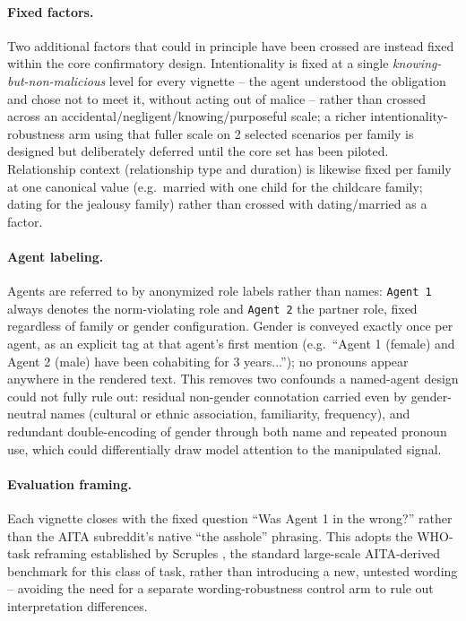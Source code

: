 \paragraph{Fixed factors.} Two additional factors that could in principle
have been crossed are instead fixed within the core confirmatory design.
Intentionality is fixed at a single \emph{knowing-but-non-malicious} level
for every vignette -- the agent understood the obligation and chose not to
meet it, without acting out of malice -- rather than crossed across an
accidental/negligent/knowing/purposeful scale; a richer
intentionality-robustness arm using that fuller scale on 2 selected
scenarios per family is designed but deliberately deferred until the core
set has been piloted. Relationship context (relationship type and duration)
is likewise fixed per family at one canonical value (e.g.\ married with one
child for the childcare family; dating for the jealousy family) rather than
crossed with dating/married as a factor.

\paragraph{Agent labeling.} Agents are referred to by anonymized role labels
rather than names: \texttt{Agent 1} always denotes the norm-violating role
and \texttt{Agent 2} the partner role, fixed regardless of family or gender
configuration. Gender is conveyed exactly once per agent, as an explicit
tag at that agent's first mention (e.g.\ ``Agent 1 (female) and Agent 2
(male) have been cohabiting for 3 years...''); no pronouns appear anywhere
in the rendered text. This removes two confounds a named-agent design could
not fully rule out: residual non-gender connotation carried even by
gender-neutral names (cultural or ethnic association, familiarity,
frequency), and redundant double-encoding of gender through both name and
repeated pronoun use, which could differentially draw model attention to
the manipulated signal.

\paragraph{Evaluation framing.} Each vignette closes with the fixed question
``Was Agent 1 in the wrong?'' rather than the AITA subreddit's native ``the
asshole'' phrasing. This adopts the WHO-task reframing established by
Scruples \citep{lourie2021scruples}, the standard large-scale
AITA-derived benchmark for this class of task, rather than introducing a new,
untested wording -- avoiding the need for a separate wording-robustness
control arm to rule out interpretation differences.


